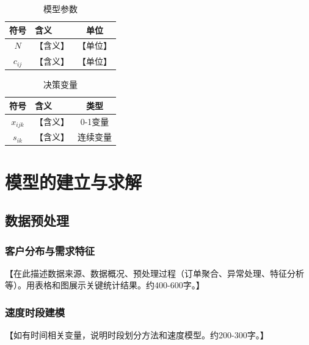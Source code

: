 \documentclass[12pt,letterpaper]{ctexart}
\numberwithin{equation}{section}
\numberwithin{figure}{section}
\numberwithin{table}{section}
\begin{document}
\begin{table}[H]
\centering
\caption{模型参数}
\begin{tabular}{c|l|c}
\toprule
\textbf{符号} & \textbf{含义} & \textbf{单位} \\
\midrule
$N$ & 【含义】 & 【单位】 \\
$c_{ij}$ & 【含义】 & 【单位】 \\
\bottomrule
\end{tabular}
\end{table}

\begin{table}[H]
\centering
\caption{决策变量}
\begin{tabular}{c|l|c}
\toprule
\textbf{符号} & \textbf{含义} & \textbf{类型} \\
\midrule
$x_{ijk}$ & 【含义】 & 0-1变量 \\
$s_{ik}$ & 【含义】 & 连续变量 \\
\bottomrule
\end{tabular}
\end{table}

\section{模型的建立与求解}

\subsection{数据预处理}

\subsubsection{客户分布与需求特征}
【在此描述数据来源、数据概况、预处理过程（订单聚合、异常处理、特征分析等）。用表格和图展示关键统计结果。约400-600字。】


\subsubsection{速度时段建模}
【如有时间相关变量，说明时段划分方法和速度模型。约200-300字。】
\end{document}
